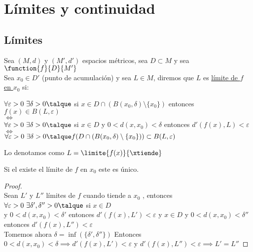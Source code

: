 	\chapter{Límites y continuidad}
	\section{Límites}	
	
	\begin{defi}Sea $(M,d)$ y $(M',d')$ espacios métricos, sea $D\subset M$ y sea $\function{f}{D}{M'}$\\ Sea $x_0\in D'$ (punto de acumulación) y sea $L\in M$, diremos que $L$ es \underline{límite de $f$ en $x_0$} si:
	\begin{center}
	$\forall\varepsilon >0\ \exists\delta>0\talque$ si $x\in D\cap(B(x_0,\delta)\setminus\{x_0\})$ entonces $f(x)\in B(L,\varepsilon)$\\
	$\iff$\\
	$\forall\varepsilon >0\ \exists\delta>0\talque$ si $x\in D$ y $0<d(x,x_0)<\delta$ entonces $d'(f(x),L)<\varepsilon$\\
	$\iff$\\
	$\forall\varepsilon >0\ \exists\delta>0\talque f(D\cap(B(x_0,\delta)\setminus\{x_0\}))\subset B(L,\varepsilon)$\\
	\end{center}	
	Lo denotamos como $L=\limite{f(x)}{\xtiende}$	
	\end{defi}
	
	\begin{proposicion} Si el existe el límite de $f$ en $x_0$ este es único.
	\begin{proof}\ \\
	Sean $L'$ y $L''$ límites de $f$ cuando tiende a $x_0$ , entonces $\forall \varepsilon>0\ \exists \delta',\delta''>0\talque$ si $x\in D$\\
	 y $0<d(x,x_0)<\delta'$ entonces $d'(f(x),L')<\varepsilon$ y $x\in D$ y $0<d(x,x_0)<\delta''$ entonces $d'(f(x),L'')<\varepsilon$\\
	 Tomemos ahora $\delta = \inf(\{\delta',\delta''\})$ Entonces $0<d(x,x_0)<\delta\implies d'(f(x),L')<\varepsilon$ y $d'(f(x),L'')<\varepsilon\implies L'=L''$
	\end{proof}
	\end{proposicion}
	
